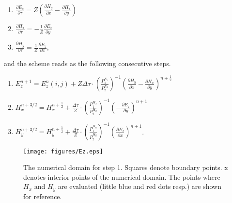 \documentclass[12pt,reqno]{amsart}
\theoremstyle{definition}
\numberwithin{equation}{section}
\begin{document}
	\begin{enumerate}
		\item  $ \frac{\partial E_z}{\partial \tau }=Z\left (
		\frac{\partial H_y}{\partial x}-\frac{\partial H_x}{\partial y}
		\right)$
		\item 	  $ \frac{\partial H_x}{\partial \tau }=-\frac{1}{Z}\frac{\partial E_z}{\partial y}$
		\item 	  $ \frac{\partial H_y}{\partial \tau }=\frac{1}{Z}\frac{\partial E_z}{\partial x}$,
		
	\end{enumerate}
	and the scheme  reads as the following consecutive steps.
	\begin{enumerate}
		\item  $ E_z^{n+1}=E_z^n(i,j)+Z\Delta \tau \cdot 
		\left(\frac{P_1^{E_z}}{P_2^{E_z}}\right)^{-1}
		\left (\frac{\partial H_y}{\partial x}-
		\frac{\partial H_x}{\partial y}
		\right)^{n+\frac{1}{2}}$\\[1mm]
		\item $ H_x^{n+3/2}=H_x^{n+\frac{1}{2}}+\frac{\Delta \tau}{Z} \cdot  \left(\frac{P_1^{H_x}}{P_2^{H_x}}\right)^{-1}\left (-
		\frac{\partial E_z}{\partial y}
		\right)^{n+1} $\\[1mm]
		\item $ H_y^{n+3/2}=H_y^{n+\frac{1}{2}}+\frac{\Delta \tau}{Z} \cdot  \left(\frac{P_1^{H_y}}{P_2^{H_y}}\right)^{-1}\left (
		\frac{\partial E_z}{\partial x}
		\right)^{n+1} $.
	\end{enumerate}
	\begin{figure}[!t]
		\centering
		\texttt{[image: figures/Ez.eps]}
		\caption{
			The numerical domain for step 1.
			Squares denote boundary points. x denotes interior points of the numerical domain.  The points where $H_x$ and $H_y$ are evaluated (little blue and red dots resp.) are shown for reference.}
		\label{fig:E}
		
	\end{figure}
	
\end{document}
